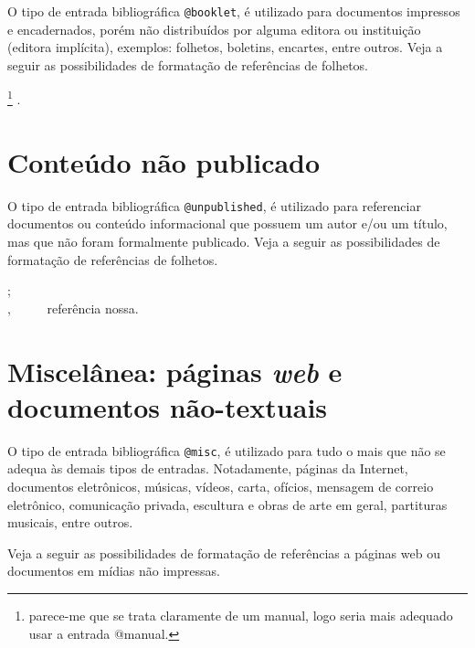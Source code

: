 \begin{apendicesenv}
O tipo de entrada bibliográfica \verb|@booklet|, é utilizado para documentos impressos e encadernados, porém não distribuídos por alguma editora ou instituição (editora implícita), exemplos: folhetos, boletins, encartes, entre outros. Veja a seguir as possibilidades de formatação de referências de folhetos.

{\small
	\cite{IBICT1993}\footnote{parece-me que se trata claramente de um manual, logo seria mais adequado usar a entrada {\ttfamily @manual}.} .\\
}



\section{Conteúdo não publicado}
\label{sec:unpublished}

O tipo de entrada bibliográfica \verb|@unpublished|, é utilizado para referenciar documentos ou conteúdo informacional que possuem um autor e/ou um título, mas que não foram formalmente publicado. Veja a seguir as possibilidades de formatação de referências de folhetos.

{\small
	\cite{Accioly} ;\\
	\cite{Oliveira2013}  , \ \ \ \ \ referência nossa.\\
}



\section{Miscelânea: páginas \textit{web} e documentos não-textuais}
\label{sec:misc}


O tipo de entrada bibliográfica \verb|@misc|, é utilizado para tudo o mais que não se adequa às demais tipos de entradas. Notadamente, páginas da Internet, documentos eletrônicos, músicas, vídeos, carta, ofícios, mensagem de correio eletrônico, comunicação privada, escultura e obras de arte em geral, partituras musicais, entre outros.

Veja a seguir as possibilidades de formatação de referências a páginas web ou documentos em mídias não impressas.


\end{apendicesenv}
